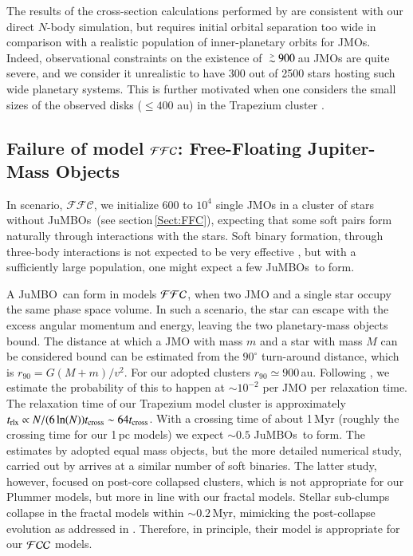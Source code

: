 \documentclass[submission,phys]{lib/SciPost}
\def\apgt{\ {\raise-.5ex\hbox{$\buildrel>\over\sim$}}\ }
\newcommand{\jumbo}{\mbox{JuMBO}}
\newcommand{\jumbos}{\mbox{JuMBOs}}
\begin{document}
The results of the cross-section calculations performed by
\cite{2023arXiv231006016W} are consistent with our direct $N$-body
simulation, but requires initial orbital separation too
wide in comparison with a realistic population of inner-planetary
orbits for JMOs. Indeed, observational constraints on the existence of
$\apgt 900$\,au JMOs are quite severe, and we consider it
unrealistic to have 300 out of 2500 stars hosting such wide
planetary systems. This is further motivated when one considers the small sizes
of the observed disks ($\leq 400$ au) in the Trapezium cluster \cite{2005A&A...441..195V}.


\subsection{Failure of model ${\cal FFC}$: Free-Floating Jupiter-Mass Objects}\label{sect:FFC_model_results}

In scenario, $\mathcal{FFC}$, we initialize $600$ to $10^4$ single
JMOs in a cluster of stars without \jumbos\, (see
section\,\ref{Sect:FFC}), expecting that some soft pairs form
naturally through interactions with the stars. Soft binary formation,
through three-body interactions is not expected to be very effective
\cite{1976A&A....53..259A}, but with a sufficiently large population,
one might expect a few \jumbos\, to form.

A \jumbo\, can form in models ${\cal FFC}$, when two JMO and a single
star occupy the same phase space volume. In such a scenario, the
star can escape with the excess angular momentum and energy, leaving
the two planetary-mass objects bound.  The distance at which a JMO with
mass $m$ and a star with mass $M$ can be considered bound can be
estimated from the $90^\circ$ turn-around distance, which is $r_{90} =
G(M+m)/v^2$.  For our adopted clusters $r_{90} \simeq
900$\,au. Following \cite{1976A&A....53..259A}, we estimate the
probability of this to happen at $\sim 10^{-2}$ per JMO per
relaxation time. The relaxation time of our Trapezium model cluster is
approximately $t_{\rm rlx} \propto N/(6\ln(N)) t_{\rm cross} \sim
64t_{\rm cross}$. With a crossing time of about 1\,Myr (roughly the
crossing time for our 1\,pc models) we expect $\sim 0.5$ \jumbos\, to
form. The estimates by \cite{1976A&A....53..259A} adopted equal mass
objects, but the more detailed numerical study, carried out by
\cite{2011MNRAS.415.1179M} arrives at a similar number of soft
binaries. The latter study, however, focused on post-core collapsed
clusters, which is not appropriate for our Plummer models, but more in
line with our fractal models. Stellar sub-clumps collapse in the
fractal models within $\sim 0.2$\,Myr, mimicking the post-collapse
evolution as addressed in \cite{2011MNRAS.415.1179M}. Therefore, in principle,
their model is appropriate for our ${\cal FCC}$ models.
\end{document}
